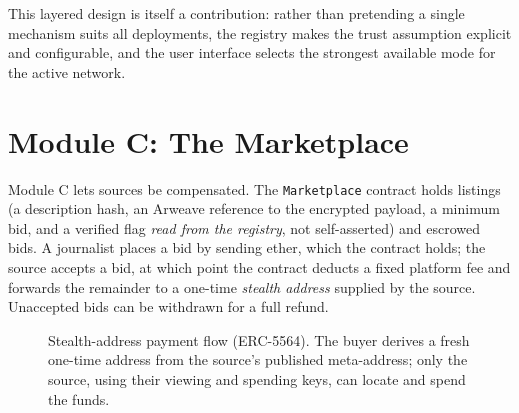 This layered design is itself a contribution: rather than pretending a single
mechanism suits all deployments, the registry makes the trust assumption explicit
and configurable, and the user interface selects the strongest available mode for
the active network.

\section{Module C: The Marketplace}
\label{sec:design-marketplace}

Module C lets sources be compensated. The \texttt{Marketplace} contract holds
listings (a description hash, an Arweave reference to the encrypted payload, a
minimum bid, and a verified flag \emph{read from the registry}, not self-asserted)
and escrowed bids. A journalist places a bid by sending ether, which the contract
holds; the source accepts a bid, at which point the contract deducts a fixed
platform fee and forwards the remainder to a one-time \emph{stealth address}
supplied by the source. Unaccepted bids can be withdrawn for a full refund.

\begin{figure}[htbp]
\centering
{}
\caption{Stealth-address payment flow (ERC-5564). The buyer derives a fresh
one-time address from the source's published meta-address; only the source, using
their viewing and spending keys, can locate and spend the funds.}
\label{fig:stealth-flow}
\end{figure}


